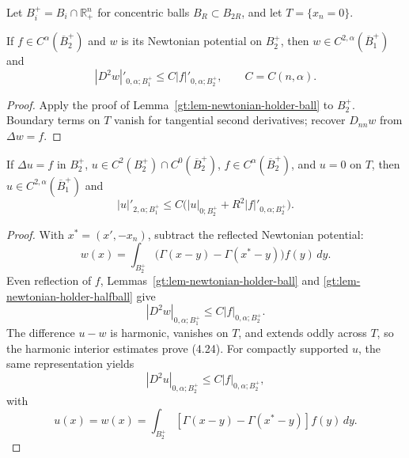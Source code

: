 Let $B_i^+=B_i\cap\mathbb R^n_+$ for concentric balls
$B_R\subset B_{2R}$, and let $T=\{x_n=0\}$.

\begin{lemma}\label{gt:lem-newtonian-holder-halfball}
If $f\in C^\alpha(\overline B_2^+)$ and $w$ is its Newtonian potential on
$B_2^+$, then $w\in C^{2,\alpha}(\overline B_1^+)$ and
\begin{equation}
\tag{4.23}
|D^2w|'_{0,\alpha;B_1^+}\leq C|f|'_{0,\alpha;B_2^+},
\qquad C=C(n,\alpha).
\end{equation}
\end{lemma}
\begin{proof}
\sketch Apply the proof of Lemma~\ref{gt:lem-newtonian-holder-ball} to
$B_2^+$. Boundary terms on $T$ vanish for tangential second derivatives;
recover $D_{nn}w$ from $\Delta w=f$.
\end{proof}

\begin{theorem}\label{gt:thm-poisson-halfball-holder}
If $\Delta u=f$ in $B_2^+$,
$u\in C^2(B_2^+)\cap C^0(\overline B_2^+)$,
$f\in C^\alpha(\overline B_2^+)$, and $u=0$ on $T$, then
$u\in C^{2,\alpha}(\overline B_1^+)$ and
\begin{equation}
\tag{4.24}
|u|'_{2,\alpha;B_1^+}
\leq C\bigl(|u|_{0;B_2^+}+R^2|f|'_{0,\alpha;B_2^+}\bigr).
\end{equation}
\end{theorem}
\begin{proof}
\sketch With $x^*=(x',-x_n)$, subtract the reflected Newtonian potential:
\begin{equation}
\tag{4.25}
w(x)=\int_{B_2^+}\bigl(\Gamma(x-y)-\Gamma(x^*-y)\bigr)f(y)\,dy.
\end{equation}
Even reflection of $f$, Lemmas~\ref{gt:lem-newtonian-holder-ball} and
\ref{gt:lem-newtonian-holder-halfball} give
\begin{equation}
\tag{4.26}
|D^2w|_{0,\alpha;B_1^+}\leq C|f|_{0,\alpha;B_2^+}.
\end{equation}
The difference $u-w$ is harmonic, vanishes on $T$, and extends oddly across
$T$, so the harmonic interior estimates prove (4.24). For compactly
supported $u$, the same representation yields
\begin{equation}
\tag{4.27}
|D^2u|_{0,\alpha;B_2^+}\leq C|f|_{0,\alpha;B_2^+},
\end{equation}
with
\begin{equation}
\tag{4.28}
u(x)=w(x)=\int_{B_2^+}
[\Gamma(x-y)-\Gamma(x^*-y)]f(y)\,dy.
\end{equation}
\end{proof}

